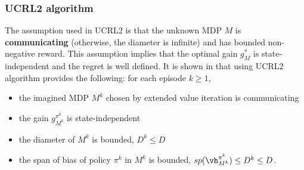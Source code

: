 \subsubsection{UCRL2 algorithm}

The assumption used in UCRL2 is that the unknown MDP $M$ is \textbf{communicating} (otherwise, the diameter is infinite) and has bounded non-negative reward.
This assumption implies that the optimal gain $g^*_M$ is state-independent and the regret is well defined.
It is shown in \cite{jaksch2010near} that using UCRL2 algorithm provides the following: for each episode $k\ge1$,
\begin{itemize}
    \item the imagined MDP $M^k$ chosen by extended value iteration is communicating
    \item the gain $g^{\pi^k}_{M^k}$ is state-independent
    \item the diameter of $M^k$ is bounded, $D^k\le D$
    \item the span of bias of policy $\pi^k$ in $M^k$ is bounded, $sp(\vh^{\pi^k}_{M^k})\le D^k\le D$.
\end{itemize}


